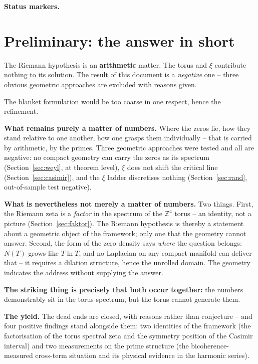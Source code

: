 
\medskip\noindent\textbf{Status markers.}


\section*{Preliminary: the answer in short}

\begin{keyresult}[Result]
The Riemann hypothesis is an \textbf{arithmetic} matter. The torus and
$\xi$ contribute nothing to its solution. The result of this document is
a \emph{negative} one -- three obvious geometric approaches are excluded
with reasons given.
\end{keyresult}

The blanket formulation would be too coarse in one respect, hence the
refinement.

\textbf{What remains purely a matter of numbers.} Where the zeros lie,
how they stand relative to one another, how one grasps them
individually -- that is carried by arithmetic, by the primes. Three
geometric approaches were tested and all are negative: no compact
geometry can carry the zeros as its spectrum (Section~\ref{sec:weyl}, at
theorem level), $\xi$ does not shift the critical line
(Section~\ref{sec:casimir}), and the $\xi$ ladder discretises nothing
(Section~\ref{sec:rand}, out-of-sample test negative).

\textbf{What is nevertheless not merely a matter of numbers.} Two
things. First, the Riemann zeta is a \emph{factor} in the spectrum of
the $\mathbb{Z}^4$ torus -- an identity, not a picture
(Section~\ref{sec:faktor}). The Riemann hypothesis is thereby a
statement about a geometric object of the framework; only one that the
geometry cannot answer. Second, the form of the zero density says
\emph{where} the question belongs: $N(T)$ grows like $T\ln T$, and no
Laplacian on any compact manifold can deliver that -- it requires a
dilation structure, hence the unrolled domain. The geometry indicates
the address without supplying the answer.

\textbf{The striking thing is precisely that both occur together:} the
numbers demonstrably sit in the torus spectrum, but the torus cannot
generate them.

\textbf{The yield.} The dead ends are closed, with reasons rather than
conjecture -- and four positive findings stand alongside them: two
identities of the framework (the factorisation of the torus spectral
zeta and the symmetry position of the Casimir interval) and two
measurements on the prime structure (the bicoherence-measured
cross-term situation and its physical evidence in the harmonic
series).

